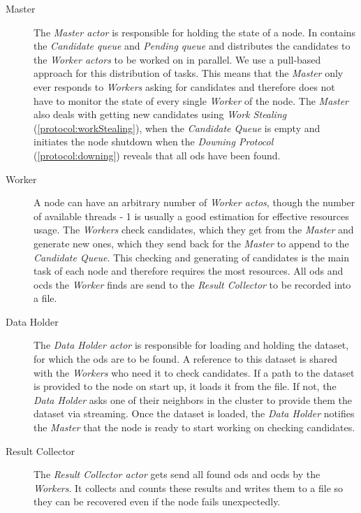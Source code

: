 \begin{description}
  \item[Master]
  The \emph{Master actor} is responsible for holding the state of a node.
  In contains the \emph{Candidate queue} and \emph{Pending queue} and distributes the candidates to the \emph{Worker actors} to be worked on in parallel. 
  We use a pull-based approach for this distribution of tasks.
  This means that the \emph{Master} only ever responds to \emph{Workers} asking for candidates and therefore does not have to monitor the state of every single \emph{Worker} of the node.
  The \emph{Master} also deals with getting new candidates using \emph{Work Stealing} (\cref{protocol:workStealing}), when the \emph{Candidate Queue} is empty and initiates the node shutdown when the \emph{Downing Protocol} (\cref{protocol:downing}) reveals that all \glspl{od} have been found.
  
  \item[Worker]
  A node can have an arbitrary number of \emph{Worker actos}, though the number of available threads - 1 is usually a good estimation for effective resources usage.
  The \emph{Workers} check candidates, which they get from the \emph{Master} and generate new ones, which they send back for the \emph{Master} to append to the \emph{Candidate Queue}.
  This checking and generating of candidates is the main task of each node and therefore requires the most resources.
  All \glspl{od} and \glspl{ocd} the \emph{Worker} finds are send to the \emph{Result Collector} to be recorded into a file. 
  
  \item[Data Holder]
  The \emph{Data Holder actor} is responsible for loading and holding the dataset, for which the \glspl{od} are to be found. 
  A reference to this dataset is shared with the \emph{Workers} who need it to check candidates.
  If a path to the dataset is provided to the node on start up, it loads it from the file.
  If not, the \emph{Data Holder} asks one of their neighbors in the cluster to provide them the dataset via streaming.
  Once the dataset is loaded, the \emph{Data Holder} notifies the \emph{Master} that the node is ready to start working on checking candidates. 
  
  \item[Result Collector]
  The \emph{Result Collector actor} gets send all found \glspl{od} and \glspl{ocd} by the \emph{Workers}.
  It collects and counts these results and writes them to a file so they can be recovered even if the node fails unexpectedly. 
  

\end{description}

